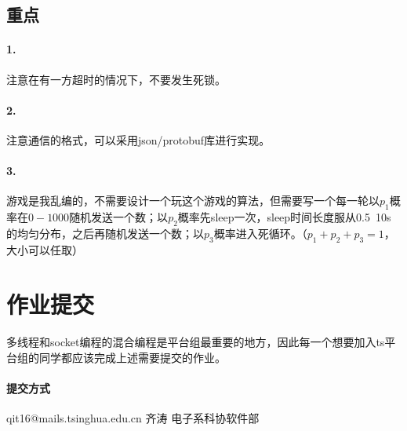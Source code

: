 \documentclass[12pt]{article}
\begin{document}
\begin{CJK}{UTF8}{gbsn}
\subsection{重点}
\paragraph{1.}注意在有一方超时的情况下，不要发生死锁。
\paragraph{2.}注意通信的格式，可以采用json/protobuf库进行实现。
\paragraph{3.}游戏是我乱编的，不需要设计一个玩这个游戏的算法，但需要写一个每一轮以$p_1$概率在$0-1000$随机发送一个数；以$p_2$概率先sleep一次，sleep时间长度服从0.5~10s的均匀分布，之后再随机发送一个数；以$p_3$概率进入死循环。（$p_1+p_2+p_3=1$，大小可以任取）


\section{作业提交}
\paragraph{}多线程和socket编程的混合编程是平台组最重要的地方，因此每一个想要加入ts平台组的同学都应该完成上述需要提交的作业。
\paragraph{提交方式}qit16@mails.tsinghua.edu.cn   齐涛 电子系科协软件部




\end{CJK}
\end{document}
